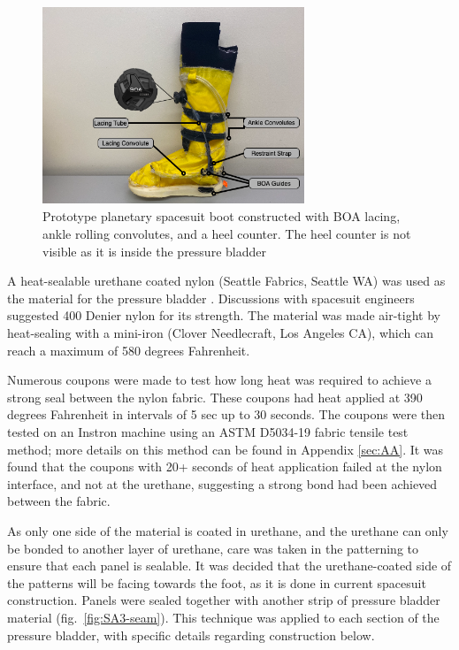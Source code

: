 \documentclass[defaultstyle,11pt]{thesis}
\begin{document}
\hypertarget{fig:SA3-proto_boot}{%
\begin{figure}
\centering
\includegraphics[width=0.7\textwidth,height=\textheight]{../fig/SA3/Proto_Spaceboot.png}
\caption[{Prototype planetary spacesuit boot constructed with BOA lacing, ankle rolling convolutes, and a heel counter}]{Prototype planetary spacesuit boot constructed with BOA lacing, ankle rolling convolutes, and a heel counter. The heel counter is not visible as it is inside the pressure bladder}
\label{fig:SA3-proto_boot}
\end{figure}
}

A heat-sealable urethane coated nylon (Seattle Fabrics, Seattle WA) was used as the material for the pressure bladder \citep{Harris2001}.
Discussions with spacesuit engineers suggested 400 Denier nylon for its strength.
The material was made air-tight by heat-sealing with a mini-iron (Clover Needlecraft, Los Angeles CA), which can reach a maximum of 580 degrees Fahrenheit.

Numerous coupons were made to test how long heat was required to achieve a strong seal between the nylon fabric.
These coupons had heat applied at 390 degrees Fahrenheit in intervals of 5 sec up to 30 seconds.
The coupons were then tested on an Instron machine using an ASTM D5034-19 fabric tensile test method; more details on this method can be found in Appendix \ref{sec:AA}.
It was found that the coupons with 20+ seconds of heat application failed at the nylon interface, and not at the urethane, suggesting a strong bond had been achieved between the fabric.

As only one side of the material is coated in urethane, and the urethane can only be bonded to another layer of urethane, care was taken in the patterning to ensure that each panel is sealable.
It was decided that the urethane-coated side of the patterns will be facing towards the foot, as it is done in current spacesuit construction.
Panels were sealed together with another strip of pressure bladder material (fig.~\ref{fig:SA3-seam}).
This technique was applied to each section of the pressure bladder, with specific details regarding construction below.
\end{document}
